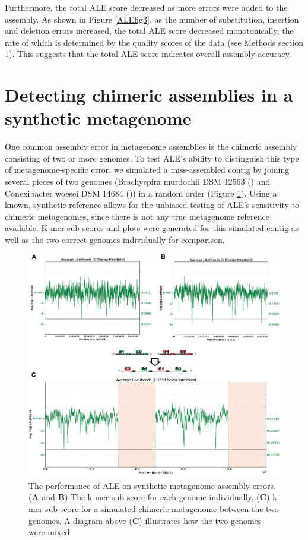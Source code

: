 \documentclass[phd,tocprelim]{cornell}
\begin{document}
Furthermore, the total ALE score decreased as more errors were added to the assembly. As shown in Figure \ref{ALEfig3}, as the number of substitution, insertion and deletion errors increased, the total ALE score decreased monotonically, the rate of which is determined by the quality scores of the data (see Methods section \ref{}). This suggests that the total ALE score indicates overall assembly accuracy.

\section{Detecting chimeric assemblies in a synthetic metagenome}
One common assembly error in metagenome assemblies is the chimeric assembly consisting of two or more genomes. To test ALE's ability to distinguish this type of metagenome-specific error, we simulated a miss-assembled contig by joining several pieces of two genomes (Brachyspira murdochii DSM 12563 (\cite{Pati2010}) and Conexibacter woesei DSM 14684 (\cite{Pukall2010})) in a random order (Figure \ref{ALEfig4}).  Using a known, synthetic reference allows for the unbiased testing of ALE's sensitivity to chimeric metagenomes, since there is not any true metagenome reference available. K-mer sub-scores and plots were generated for this simulated contig as well as the two correct genomes individually for comparison.

\begin{figure}[!tpb]%
    \centerline{\includegraphics[width=\textwidth]{figures/ALE/Clark_Fig4b.png}}
    \caption[ALE performance on synthetic metagenome]{The performance of ALE on synthetic metagenome assembly errors. ({\bf A} and {\bf B}) The k-mer sub-score for each genome individually. ({\bf C}) k-mer sub-score for a simulated chimeric metagenome between the two genomes. A diagram above ({\bf C}) illustrates how the two genomes were mixed.}\label{ALEfig4}
\end{figure}
\end{document}
